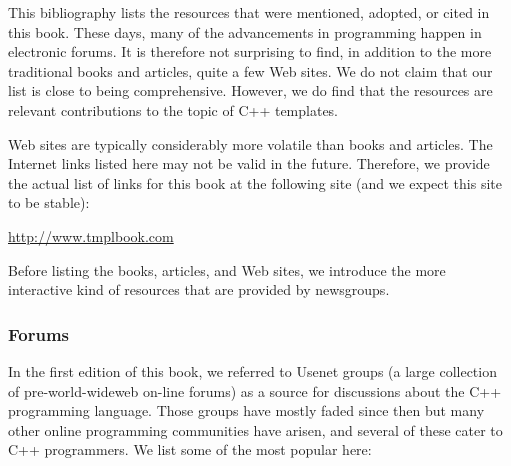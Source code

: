 
This bibliography lists the resources that were mentioned, adopted, or cited in this book. These days, many of the advancements in programming happen in electronic forums. It is therefore not surprising to find, in addition to the more traditional books and articles, quite a few Web sites. We do not claim that our list is close to being comprehensive. However, we do find that the resources are relevant contributions to the topic of C++ templates.

Web sites are typically considerably more volatile than books and articles. The Internet links listed here may not be valid in the future. Therefore, we provide the actual list of links for this book at the following site (and we expect this site to be stable):

\url{http://www.tmplbook.com}

Before listing the books, articles, and Web sites, we introduce the more interactive kind of resources that are provided by newsgroups.

\subsubsection*{Forums}

In the first edition of this book, we referred to Usenet groups (a large collection of pre-world-wideweb on-line forums) as a source for discussions about the C++ programming language. Those groups have mostly faded since then but many other online programming communities have arisen, and several of these cater to C++ programmers. We list some of the most popular here:

